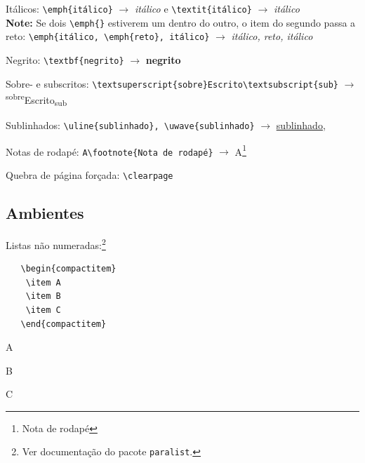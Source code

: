 \documentclass[hittite,linearb,armenian,hebraico,russian,sanskrit]{tesecaiera}
\begin{document}
\begin{compactitem}
  \item Itálicos: \lstinline!\emph{itálico}! $\rightarrow$ \emph{itálico} e
    \lstinline!\textit{itálico}! $\rightarrow$ \emph{itálico}\\
    \textbf{Note:} Se dois \lstinline!\emph{}! estiverem um dentro do outro, o
    item do segundo passa a reto: 
    \lstinline!\emph{itálico, \emph{reto}, itálico}! 
    $\rightarrow$ \emph{itálico, \emph{reto},
    itálico}
\item Negrito: \lstinline!\textbf{negrito}! $\rightarrow$ \textbf{negrito}
\item Sobre- e subscritos:
  \lstinline!\textsuperscript{sobre}Escrito\textsubscript{sub}! $\rightarrow$ \textsuperscript{sobre}Escrito\textsubscript{sub}
\item Sublinhados: \lstinline!\uline{sublinhado}, \uwave{sublinhado}! $\rightarrow$ \uline{sublinhado}, 
\item Notas de rodapé: \lstinline!A\footnote{Nota de rodapé}! $\rightarrow$ A\footnote{Nota de rodapé}
\item Quebra de página forçada: \lstinline!\clearpage!
\end{compactitem}

\subsection*{Ambientes}

\noindent  Listas não numeradas:\footnote{Ver documentação do pacote
   \texttt{paralist}.}

  \begin{lstlisting}
   \begin{compactitem}
    \item A
    \item B
    \item C
   \end{compactitem}
  \end{lstlisting}
   \begin{compactitem}
    \item A
    \item B
    \item C
   \end{compactitem}
\end{document}
